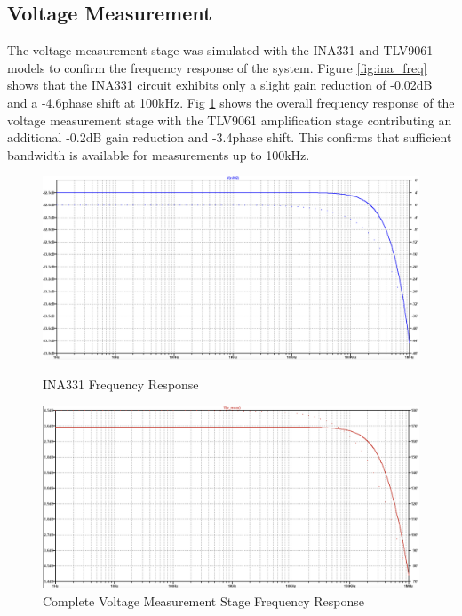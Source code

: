 \subsection{Voltage Measurement}
The voltage measurement stage was simulated with the INA331 and TLV9061 models to confirm the frequency response of the system. Figure \ref{fig:ina_freq} shows that the INA331 circuit exhibits only a slight gain reduction of -0.02dB and a -4.6\textdegree phase shift at 100kHz. Fig \ref{fig:v_meas_freq} shows the overall frequency response of the voltage measurement stage with the TLV9061 amplification stage contributing an additional -0.2dB gain reduction and -3.4\textdegree phase shift. This confirms that sufficient bandwidth is available for measurements up to 100kHz.

\begin{figure}[H]
    \centering
    \begin{minipage}{0.48\textwidth}
        \centering
        \includegraphics[width=\textwidth]{INA331FreqResponse.png}
        \caption{INA331 Frequency Response}
        \label{fig:ina_freq}
    \end{minipage}\hfill
    \begin{minipage}{0.48\textwidth}
        \centering
        \includegraphics[width=\textwidth]{VmeasFreqResponse.png}
        \caption{Complete Voltage Measurement Stage Frequency Response}
        \label{fig:v_meas_freq}
    \end{minipage}
\end{figure}

